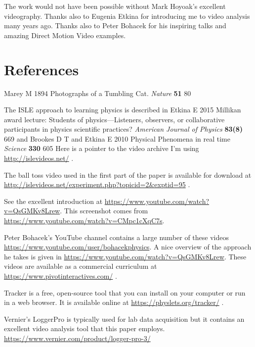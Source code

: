 \documentclass[12pt]{iopart}
\begin{document}
\ack
The work would not have been possible without Mark Hoyoak's excellent videography.  Thanks also to Eugenia Etkina for introducing me to video analysis many years ago.  Thanks also to Peter Bohacek for his inspiring talks and amazing Direct Motion Video examples.  


\section*{References}
\begin{thebibliography}{99}

Marey M
1894
Photographs of a Tumbling Cat. 
{\it Nature }
{\bf 51} 
80

The ISLE approach to learning physics is described in 
Etkina E 
2015
Millikan award lecture: Students of physics—Listeners, observers, or collaborative participants in physics scientific practices?
{\it American Journal of Physics}
{\bf 83(8)}
669
and 
Brookes D T and Etkina E
2010
Physical Phenomena in real time
{\it Science}
{\bf 330}
605
Here is a pointer to the video archive I'm using \url{http://islevideos.net/} .
  
The ball toss video used in the first part of the paper is available for download at \url{http://islevideos.net/experiment.php?topicid=2&exptid=95} .

See the excellent introduction at 
\url{https://www.youtube.com/watch?v=QsGMKv8Lrew}. This screenshot comes from \url{https://www.youtube.com/watch?v=CMpc1cXqC7s}.

 Peter Bohacek's YouTube channel contains a large number of these videos \url{https://www.youtube.com/user/bohacekphysics}.  
A nice overview of the approach he takes is given in \url{https://www.youtube.com/watch?v=QsGMKv8Lrew}. 
These videos are available as a commercial curriculum at \url{https://www.pivotinteractives.com/} .

 Tracker is a free, open-source tool that you can install on your computer or run in a web browser.  It is available online at \url{https://physlets.org/tracker/} .

 Vernier's LoggerPro is typically used for lab data acquisition but it contains an excellent video analysis tool that this paper employs. 
\url{https://www.vernier.com/product/logger-pro-3/}


\end{thebibliography}
\end{document}
